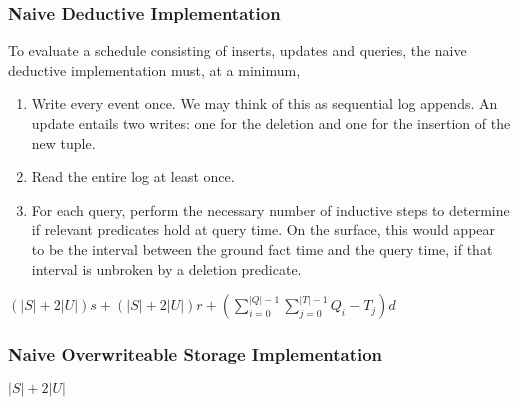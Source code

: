 \subsubsection{Naive Deductive Implementation}

To evaluate a schedule consisting of inserts, updates and queries, the naive deductive implementation must,
at a minimum,
\begin{enumerate}
\item Write every event once.  We may think of this as sequential log appends.  An update entails two writes: one for the deletion
and one for the insertion of the new tuple.
\item Read the entire log at least once.
\item For each query, perform the necessary number of inductive steps to determine if relevant predicates hold at query time.
On the surface, this would appear to be the interval between the ground fact time and the query time, if that interval is unbroken
by a deletion predicate.
\end{enumerate}

$(|S|+2|U|)s + (|S|+2|U|)r + (\displaystyle\sum_{i=0}^{|Q|-1} \displaystyle\sum_{j=0}^{|T|-1} Q_{i} - T_{j})d$

\subsubsection{Naive Overwriteable Storage Implementation}

$|S| + 2|U|$

